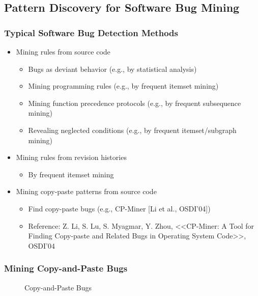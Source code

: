 \subsection{Pattern Discovery for Software Bug Mining}

\subsubsection{Typical Software Bug Detection Methods}
\begin{itemize}
\item Mining rules from source code
    \begin{itemize}
    \item Bugs as deviant behavior (e.g., by statistical analysis)
    \item Mining programming rules (e.g., by frequent itemset mining)
    \item Mining function precedence protocols (e.g., by frequent subsequence mining) 
    \item Revealing neglected conditions (e.g., by frequent itemset/subgraph mining)
    \end{itemize}

\item Mining rules from revision histories 
    \begin{itemize}
    \item By frequent itemset mining
    \end{itemize}

\item Mining copy-paste patterns from source code
    \begin{itemize}
    \item Find copy-paste bugs (e.g., CP-Miner [Li et al., OSDI’04])
    \item Reference: Z. Li, S. Lu, S. Myagmar, Y. Zhou, <<CP-Miner: A Tool for Finding Copy-paste and Related Bugs in Operating System Code>>, OSDI’04
    \end{itemize}
\end{itemize}

\subsubsection{Mining Copy-and-Paste Bugs}
\begin{figure}[h]
\centering
{}
\quad
{}

\caption{Copy-and-Paste Bugs}
\label{fig:cp12}
\end{figure}

